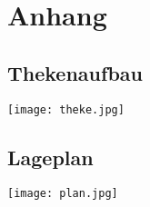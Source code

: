 \section{Anhang}
\subsection{Thekenaufbau}
\texttt{[image: theke.jpg]}
\subsection{Lageplan}
\texttt{[image: plan.jpg]}
